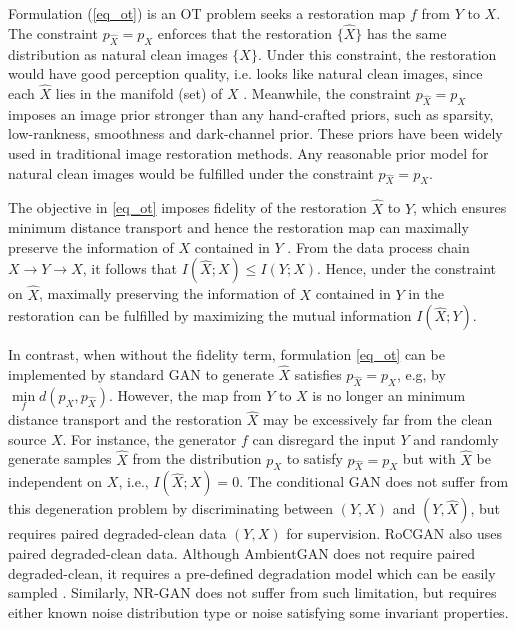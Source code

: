 \documentclass[10pt,journal,compsoc]{IEEEtran}
\begin{document}
Formulation (\ref{eq_ot}) is an OT problem seeks a 
restoration map $f$ from $Y$ to $X$. 
The constraint ${p_{\hat X}} = {p_X}$ enforces 
that the restoration $\{\hat X\}$ 
has the same distribution as natural clean images $\{X\}$.
Under this constraint, the restoration would have good perception quality, 
i.e. looks like natural clean images, since each $\hat X$
lies in the manifold (set) of $X$ \cite{blau2018perception,yan2021perceptual,blau2019rethinking, yan2022perceptual}.
Meanwhile, the constraint ${p_{\hat X}} = {p_X}$
imposes an image prior stronger than any hand-crafted priors,
such as sparsity, low-rankness, smoothness and dark-channel prior.
These priors have been widely used in traditional 
image restoration methods. Any reasonable prior model
for natural clean images would be fulfilled under 
the constraint ${p_{\hat X}} = {p_X}$.

The objective in \eqref{eq_ot} imposes fidelity 
of the restoration $\hat X$ to $Y$, 
which ensures minimum distance transport and hence
the restoration map can maximally preserve the 
information of $X$ contained in $Y$ \cite{wang2022optimal}.
From the data process chain $X\rightarrow Y \rightarrow\hat{X}$, 
it follows that $I(\hat X;X) \leq I(Y;X)$. 
Hence, under the constraint on $\hat{X}$, maximally preserving the information of $X$ contained in $Y$
in the restoration can be fulfilled by maximizing the mutual 
information $I(\hat X;Y)$. 

In contrast, when without the fidelity term, 
formulation \eqref{eq_ot} can be implemented by standard GAN
to generate $\hat X$ satisfies ${p_{\hat X}} = {p_X}$, e.g,
by $\mathop {\min }\limits_f d({p_X},{p_{\hat X}})$.
However, the map from $Y$ to $X$ is no longer an 
minimum distance transport and the restoration $\hat X$
may be excessively far from the clean source $X$.
For instance, the generator $f$ can disregard the input $Y$ 
and randomly generate samples $\hat{X}$ from the distribution ${p_X}$ 
to satisfy ${{p_{\hat X}} = p_X}$ but with $\hat{X}$ 
be independent on $X$, i.e., $I(\hat{X};X)=0$.
The conditional GAN \cite{cgan} does not suffer from
this degeneration problem by discriminating between $(Y,X)$ and $(Y,\hat X)$, 
but requires paired degraded-clean data $(Y,X)$ for supervision. 
RoCGAN \cite{RoCGAN} also uses paired degraded-clean data.
Although AmbientGAN does not require paired degraded-clean, 
it requires a pre-defined degradation model 
which can be easily sampled \cite{ambientgan}. 
Similarly, NR-GAN \cite{nrgan} does not suffer
from such limitation, but requires either 
known noise distribution type or noise satisfying some
invariant properties. 
\end{document}
